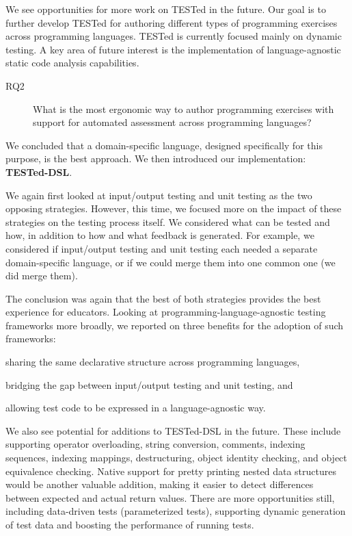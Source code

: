 \documentclass[main]{subfiles}
\begin{document}
We see opportunities for more work on TESTed in the future.
Our goal is to further develop TESTed for authoring different types of programming exercises across programming languages.
TESTed is currently focused mainly on dynamic testing.
A key area of future interest is the implementation of language-agnostic static code analysis capabilities.

\begin{description}
    \item[RQ2] What is the most ergonomic way to author programming exercises with support for automated assessment across programming languages?
\end{description}

We concluded that a domain-specific language, designed specifically for this purpose, is the best approach.
We then introduced our implementation: \textbf{TESTed-DSL}\@.

We again first looked at input/output testing and unit testing as the two opposing strategies.
However, this time, we focused more on the impact of these strategies on the testing process itself.
We considered what can be tested and how, in addition to how and what feedback is generated.
For example, we considered if input/output testing and unit testing each needed a separate domain-specific language, or if we could merge them into one common one (we did merge them).

The conclusion was again that the best of both strategies provides the best experience for educators.
Looking at programming-language-agnostic testing frameworks more broadly, we reported on three benefits for the adoption of such frameworks: \begin{enumerate*}[label=\emph{\roman*})] \item sharing the same declarative structure across programming languages, \item bridging the gap between input/output testing and unit testing, and \item allowing test code to be expressed in a language-agnostic way.\end{enumerate*}

We also see potential for additions to TESTed-DSL in the future.
These include supporting operator overloading, string conversion, comments, indexing sequences, indexing mappings, destructuring, object identity checking, and object equivalence checking.
Native support for pretty printing nested data structures would be another valuable addition, making it easier to detect differences between expected and actual return values.
There are more opportunities still, including data-driven tests (parameterized tests), supporting dynamic generation of test data and boosting the performance of running tests.
\end{document}
